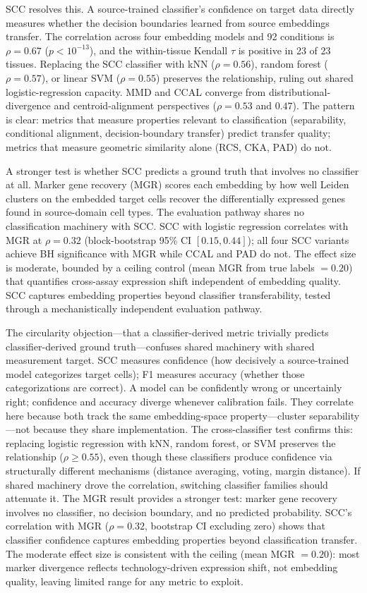 \documentclass[11pt]{article}
\begin{document}
SCC resolves this. A source-trained classifier's confidence on target
data directly measures whether the decision boundaries learned from
source embeddings transfer. The correlation across four embedding
models and 92 conditions is $\rho = 0.67$ ($p < 10^{-13}$), and the
within-tissue Kendall $\tau$ is positive in 23 of 23 tissues.
Replacing the SCC classifier with kNN ($\rho = 0.56$), random forest
($\rho = 0.57$), or linear SVM ($\rho = 0.55$) preserves the
relationship, ruling out shared logistic-regression capacity. MMD and
CCAL converge from distributional-divergence and centroid-alignment
perspectives ($\rho = 0.53$ and $0.47$). The pattern is clear:
metrics that measure properties relevant to classification
(separability, conditional alignment, decision-boundary transfer)
predict transfer quality; metrics that measure geometric similarity
alone (RCS, CKA, PAD) do not.

A stronger test is whether SCC predicts a ground truth that involves
no classifier at all. Marker gene recovery (MGR) scores each embedding
by how well Leiden clusters on the embedded target cells recover the
differentially expressed genes found in source-domain cell types. The
evaluation pathway shares no classification machinery with SCC. SCC
with logistic regression correlates with MGR at $\rho = 0.32$
(block-bootstrap 95\% CI $[0.15, 0.44]$); all four SCC variants
achieve BH significance with MGR while CCAL and PAD do not. The
effect size is moderate, bounded by a ceiling control (mean MGR from
true labels $= 0.20$) that quantifies cross-assay expression shift
independent of embedding quality. SCC captures embedding properties
beyond classifier transferability, tested through a mechanistically
independent evaluation pathway.

The circularity objection---that a classifier-derived metric trivially
predicts classifier-derived ground truth---confuses shared machinery
with shared measurement target. SCC measures confidence (how decisively
a source-trained model categorizes target cells); F1 measures accuracy
(whether those categorizations are correct). A model can be confidently
wrong or uncertainly right; confidence and accuracy diverge whenever
calibration fails. They correlate here because both track the same
embedding-space property---cluster separability---not because they share
implementation. The cross-classifier test confirms this: replacing
logistic regression with kNN, random forest, or SVM preserves the
relationship ($\rho \geq 0.55$), even though these classifiers produce
confidence via structurally different mechanisms (distance averaging,
voting, margin distance). If shared machinery drove the correlation,
switching classifier families should attenuate it. The MGR result
provides a stronger test: marker gene recovery involves no classifier,
no decision boundary, and no predicted probability. SCC's correlation
with MGR ($\rho = 0.32$, bootstrap CI excluding zero) shows that
classifier confidence captures embedding properties beyond
classification transfer. The moderate effect size is consistent with
the ceiling (mean MGR $= 0.20$): most marker divergence reflects
technology-driven expression shift, not embedding quality, leaving
limited range for any metric to exploit.
\end{document}
